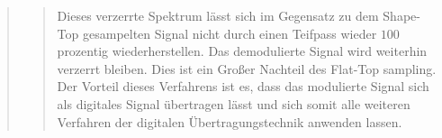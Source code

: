\begin{quote}
\begin{quote}
        Dieses verzerrte Spektrum lässt sich im Gegensatz zu dem Shape-Top gesampelten Signal nicht durch einen Teifpass
        wieder $100$ prozentig wiederherstellen. Das demodulierte Signal wird weiterhin verzerrt bleiben. Dies ist ein
        Großer Nachteil des Flat-Top sampling.\\
        Der Vorteil dieses Verfahrens ist es, dass das modulierte Signal sich als digitales Signal übertragen lässt und
        sich somit alle weiteren Verfahren der digitalen Übertragungstechnik anwenden lassen. 
    

    \end{quote}%
\end{quote}%

